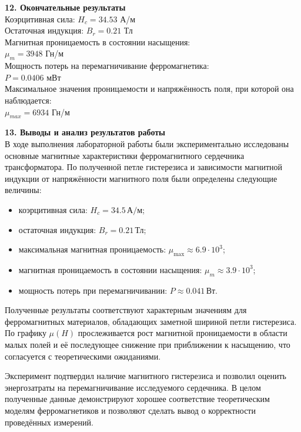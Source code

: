 \documentclass[12pt,fleqn]{article}
\begin{document}
\begin{justify}
    \textbf{12. Окончательные результаты} \\
    Коэрцитивная сила: $ H_c = 34.53 $ А/м \\
    Остаточная индукция: $ B_r = 0.21 $ Тл \\
    Магнитная проницаемость в состоянии насыщения: \\
    $ \mu_m = 3948 $ Гн/м \\
    Мощность потерь на перемагничивание ферромагнетика: \\
    $ P = 0.0406 $ мВт \\
    Максимальное значения проницаемости и напряжённость поля, при которой она наблюдается: \\
    $ \mu_{max} = 6934 $ Гн/м \\ 
\end{justify}

\begin{justify}
\textbf{13. Выводы и анализ результатов работы} \\
В ходе выполнения лабораторной работы были экспериментально исследованы основные 
магнитные характеристики ферромагнитного сердечника трансформатора. 
По полученной петле гистерезиса и зависимости магнитной индукции от 
напряжённости магнитного поля были определены следующие величины:

\begin{itemize}
    \item коэрцитивная сила: $ H_c = 34.5 \, \text{А/м} $;
    \item остаточная индукция: $ B_r = 0.21 \, \text{Тл} $;
    \item максимальная магнитная проницаемость: $ \mu_{\max} \approx 6.9 \cdot 10^{3} $;
    \item магнитная проницаемость в состоянии насыщения: $ \mu_m \approx 3.9 \cdot 10^{3} $;
    \item мощность потерь при перемагничивании: $ P \approx 0.041 \, \text{Вт} $.
\end{itemize}

Полученные результаты соответствуют характерным значениям для 
ферромагнитных материалов, обладающих заметной шириной петли гистерезиса. 
По графику $\mu(H)$ прослеживается рост магнитной проницаемости в области 
малых полей и её последующее снижение при приближении к насыщению, 
что согласуется с теоретическими ожиданиями.

Эксперимент подтвердил наличие магнитного гистерезиса и позволил 
оценить энергозатраты на перемагничивание исследуемого сердечника. 
В целом полученные данные демонстрируют хорошее соответствие 
теоретическим моделям ферромагнетиков и позволяют сделать вывод 
о корректности проведённых измерений.
\end{justify}
\end{document}

